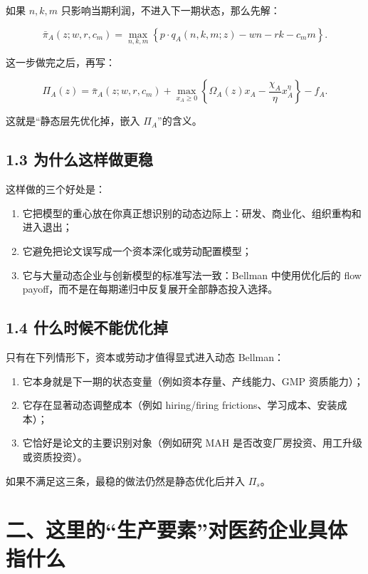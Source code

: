 \documentclass[12pt]{ctexart}
\begin{document}
如果 \(n,k,m\) 只影响当期利润，不进入下一期状态，那么先解：

\[
\bar{\pi}_A(z;w,r,c_m)
=
\max_{n,k,m}
\left\{
p\cdot q_A(n,k,m;z)-wn-rk-c_m m
\right\}.
\]

这一步做完之后，再写：

\[
\Pi_A(z)
=
\bar{\pi}_A(z;w,r,c_m)
+
\max_{x_A\ge 0}
\left\{
\Omega_A(z)x_A-\frac{\chi_A}{\eta}x_A^\eta
\right\}
-f_A.
\]

这就是“静态层先优化掉，嵌入 \(\Pi_A\)”的含义。

\subsection{1.3 为什么这样做更稳}

这样做的三个好处是：

\begin{enumerate}[leftmargin=2em]
    \item 它把模型的重心放在你真正想识别的动态边际上：研发、商业化、组织重构和进入退出；
    \item 它避免把论文误写成一个资本深化或劳动配置模型；
    \item 它与大量动态企业与创新模型的标准写法一致：Bellman 中使用优化后的 flow payoff，而不是在每期递归中反复展开全部静态投入选择。
\end{enumerate}

\subsection{1.4 什么时候不能优化掉}

只有在下列情形下，资本或劳动才值得显式进入动态 Bellman：

\begin{enumerate}[leftmargin=2em]
    \item 它本身就是下一期的状态变量（例如资本存量、产线能力、GMP 资质能力）；
    \item 它存在显著动态调整成本（例如 hiring/firing frictions、学习成本、安装成本）；
    \item 它恰好是论文的主要识别对象（例如研究 MAH 是否改变厂房投资、用工升级或资质投资）。
\end{enumerate}

如果不满足这三条，最稳的做法仍然是静态优化后并入 \(\Pi_s\)。

\section{二、这里的“生产要素”对医药企业具体指什么}
\end{document}
